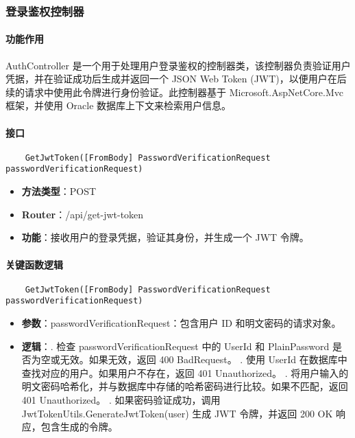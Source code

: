 \subsubsection{登录鉴权控制器}

\paragraph{功能作用}

AuthController 是一个用于处理用户登录鉴权的控制器类，该控制器负责验证用户凭据，并在验证成功后生成并返回一个 JSON Web Token (JWT)，以便用户在后续的请求中使用此令牌进行身份验证。此控制器基于 Microsoft.AspNetCore.Mvc 框架，并使用 Oracle 数据库上下文来检索用户信息。

\paragraph{接口}

\begin{verbatim}
	GetJwtToken([FromBody] PasswordVerificationRequest passwordVerificationRequest)
\end{verbatim}

\begin{itemize}
	\item \textbf{方法类型}：POST
	\item \textbf{Router}：/api/get-jwt-token
	\item \textbf{功能}：接收用户的登录凭据，验证其身份，并生成一个 JWT 令牌。
\end{itemize}

\paragraph{关键函数逻辑}

\begin{verbatim}
	GetJwtToken([FromBody] PasswordVerificationRequest passwordVerificationRequest)
\end{verbatim}

\begin{itemize}
	\item \textbf{参数}：passwordVerificationRequest：包含用户 ID 和明文密码的请求对象。
	\item \textbf{逻辑}：. 检查 passwordVerificationRequest 中的 UserId 和 PlainPassword 是否为空或无效。如果无效，返回 400 BadRequest。 . 使用 UserId 在数据库中查找对应的用户。如果用户不存在，返回 401 Unauthorized。 . 将用户输入的明文密码哈希化，并与数据库中存储的哈希密码进行比较。如果不匹配，返回 401 Unauthorized。 . 如果密码验证成功，调用 JwtTokenUtils.GenerateJwtToken(user) 生成 JWT 令牌，并返回 200 OK 响应，包含生成的令牌。
\end{itemize}

